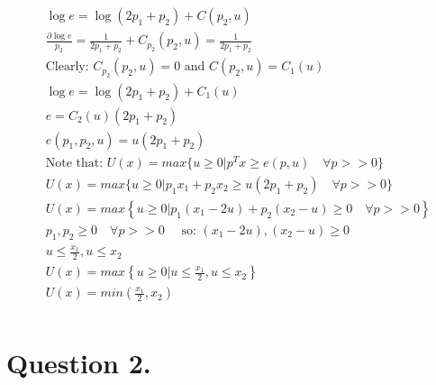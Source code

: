 \documentclass[10pt, letterpaper]{paper}
\begin{document}
\begin{equation*}
\begin{alignedat}{1}
&\log{e} = \log{( 2p_1 + p_2 )} + C( p_2,u )\\
&\frac{ \partial \log{e}}{ p_2} = \frac{ 1}{ 2p_1 + p_2 } + C_{p_2}( p_2, u ) = \frac{ 1}{ 2p_1 + p_2}\\
&\text{Clearly: }  C_{p_2}( p_2, u ) = 0 \text{ and } C( p_2, u ) = C_1 (u )\\
&\log{e} = \log{( 2p_1 + p_2 )} + C_1 (u) \\
&e = C_2 (u) (2p_1 + p_2 )\\
&e( p_1, p_2, u ) = u ( 2p_1 + p_2 )\\
&\text{Note that: }U(x) = max\{ u \geq 0 | p^T x \geq e( p, u) \quad \forall p >> 0 \}\\
&U(x)= max\{ u \geq 0 | p_1 x_1 + p_2 x_2 \geq u( 2p_1 + p_2 ) \quad \forall p >> 0 \}\\
&U(x) = max \left \{ u \geq 0 | p_1 ( x_1 - 2u ) + p_2 ( x_2 - u ) \geq 0 \quad \forall p >> 0 \right \}\\
&p_1, p_2 \geq 0 \quad \forall p >> 0 \quad \text{ so: } (x_1 - 2u ), (x_2 - u ) \geq 0\\
&u \leq \frac{ x_1 }{2} , u \leq x_2\\
&U(x) = max \left \{ u \geq 0 | u \leq \frac{ x_1}{2}, u \leq x_2 \right \}\\
&U(x) = min( \frac{x_1}{2},x_2 )\\ 
\end{alignedat}
\end{equation*}


\section*{Question 2.}
\end{document}
